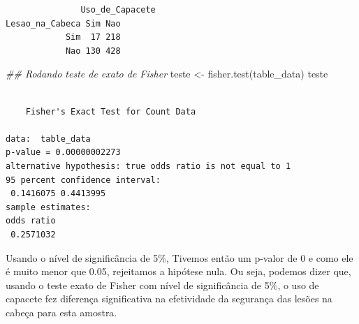 \documentclass[
  letterpaper,
  DIV=11,
  numbers=noendperiod]{scrartcl}
\newenvironment{Shaded}{\begin{snugshade}}{\end{snugshade}}
\newcommand{\DocumentationTok}[1]{\textcolor[rgb]{0.37,0.37,0.37}{\textit{#1}}}
\newcommand{\FunctionTok}[1]{\textcolor[rgb]{0.28,0.35,0.67}{#1}}
\newcommand{\NormalTok}[1]{\textcolor[rgb]{0.00,0.23,0.31}{#1}}
\newcommand{\OtherTok}[1]{\textcolor[rgb]{0.00,0.23,0.31}{#1}}
\begin{document}
\begin{verbatim}
               Uso_de_Capacete
Lesao_na_Cabeca Sim Nao
            Sim  17 218
            Nao 130 428
\end{verbatim}

\begin{Shaded}
\begin{Highlighting}[]
\DocumentationTok{\#\# Rodando teste de exato de Fisher}
\NormalTok{teste }\OtherTok{\textless{}{-}} \FunctionTok{fisher.test}\NormalTok{(table\_data)}
\NormalTok{teste}
\end{Highlighting}
\end{Shaded}

\begin{verbatim}

    Fisher's Exact Test for Count Data

data:  table_data
p-value = 0.00000002273
alternative hypothesis: true odds ratio is not equal to 1
95 percent confidence interval:
 0.1416075 0.4413995
sample estimates:
odds ratio 
 0.2571032 
\end{verbatim}

Usando o nível de significância de 5\%, Tivemos então um p-valor de 0 e
como ele é muito menor que 0.05, rejeitamos a hipótese nula. Ou seja,
podemos dizer que, usando o teste exato de Fisher com nível de
significância de 5\%, o uso de capacete fez diferença significativa na
efetividade da segurança das lesões na cabeça para esta amostra.
\end{document}
